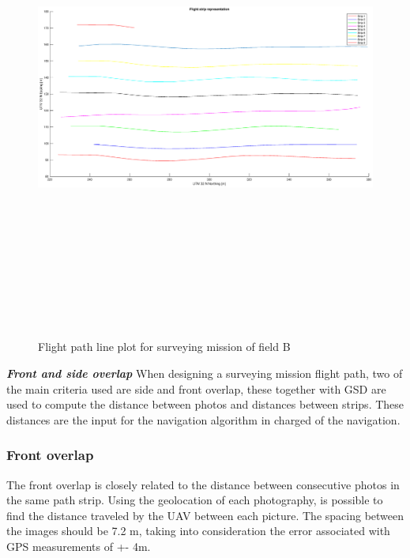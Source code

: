 \begin{figure}[H]
\centering
\includegraphics[width=16cm,height=16cm,keepaspectratio]{imagenes/strips.eps}
\caption{ Flight path line plot for surveying mission of field B}
\label{fig:FielB}
\end{figure}

\textit{\textbf{Front and side overlap}}
When designing a surveying mission flight path, two of the main criteria used are side and front overlap, these together with GSD are used to compute the distance between photos and distances between strips. These distances are the input for the navigation algorithm in charged of the navigation.
\subsubsection{Front overlap}
The front overlap is closely related to the distance between consecutive photos in the same path strip.  Using the geolocation of each photography, is possible to find the distance traveled by the UAV between each picture. The spacing between the images should be 7.2 m, taking into consideration the error associated with GPS measurements of +- 4m. 


